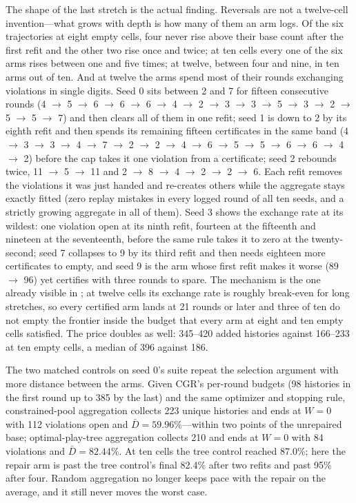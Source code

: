 \documentclass[conference]{IEEEtran}
\begin{document}
The shape of the last stretch is the actual finding. Reversals are not a twelve-cell invention---what grows with depth is how many of them an arm logs. Of the six trajectories at eight empty cells, four never rise above their base count after the first refit and the other two rise once and twice; at ten cells every one of the six arms rises between one and five times; at twelve, between four and nine, in ten arms out of ten. And at twelve the arms spend most of their rounds exchanging violations in single digits. Seed 0 sits between 2 and 7 for fifteen consecutive rounds (4 $\to$ 5 $\to$ 6 $\to$ 6 $\to$ 6 $\to$ 4 $\to$ 2 $\to$ 3 $\to$ 3 $\to$ 5 $\to$ 3 $\to$ 2 $\to$ 5 $\to$ 5 $\to$ 7) and then clears all of them in one refit; seed 1 is down to 2 by its eighth refit and then spends its remaining fifteen certificates in the same band (4 $\to$ 3 $\to$ 3 $\to$ 4 $\to$ 7 $\to$ 2 $\to$ 2 $\to$ 4 $\to$ 6 $\to$ 5 $\to$ 5 $\to$ 6 $\to$ 6 $\to$ 4 $\to$ 2) before the cap takes it one violation from a certificate; seed 2 rebounds twice, 11 $\to$ 5 $\to$ 11 and 2 $\to$ 8 $\to$ 4 $\to$ 2 $\to$ 2 $\to$ 6. Each refit removes the violations it was just handed and re-creates others while the aggregate stays exactly fitted (zero replay mistakes in every logged round of all ten seeds, and a strictly growing aggregate in all of them). Seed 3 shows the exchange rate at its wildest: one violation open at its ninth refit, fourteen at the fifteenth and nineteen at the seventeenth, before the same rule takes it to zero at the twenty-second; seed 7 collapses to 9 by its third refit and then needs eighteen more certificates to empty, and seed 9 is the arm whose first refit makes it worse (89 $\to$ 96) yet certifies with three rounds to spare. The mechanism is the one already visible in ; at twelve cells its exchange rate is roughly break-even for long stretches, so every certified arm lands at 21 rounds or later and three of ten do not empty the frontier inside the budget that every arm at eight and ten empty cells satisfied. The price doubles as well: 345--420 added histories against 166--233 at ten empty cells, a median of 396 against 186.

The two matched controls on seed 0's suite repeat the selection argument with more distance between the arms. Given CGR's per-round budgets (98 histories in the first round up to 385 by the last) and the same optimizer and stopping rule, constrained-pool aggregation collects 223 unique histories and ends at $W=0$ with 112 violations open and $\bar D=59.96\%$---within two points of the unrepaired base; optimal-play-tree aggregation collects 210 and ends at $W=0$ with 84 violations and $\bar D=82.44\%$. At ten cells the tree control reached 87.0\%; here the repair arm is past the tree control's final 82.4\% after two refits and past 95\% after four. Random aggregation no longer keeps pace with the repair on the average, and it still never moves the worst case.
\end{document}
